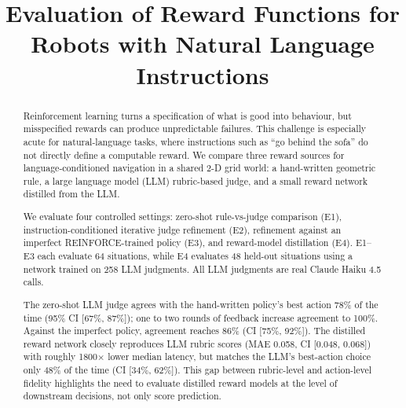 \documentclass[conference]{IEEEtran}
\newcommand\AtPageUpperMyright[1]{\AtPageUpperLeft{%
  \put(\LenToUnit{0.17\paperwidth},\LenToUnit{-2cm}){%
    \parbox{0.9\textwidth}{\raggedleft\fontsize{8}{11}\selectfont #1}}}}
\newcommand{\conf}[1]{\AddToShipoutPictureBG*{\AtPageUpperMyright{#1}}}
\begin{document}
\title{Evaluation of Reward Functions for Robots with Natural Language Instructions}

\author{
\and
{}
}

\maketitle

\begin{abstract}
Reinforcement learning turns a specification of what is good into behaviour, but misspecified rewards can produce unpredictable failures. This challenge is especially acute for natural-language tasks, where instructions such as “go behind the sofa” do not directly define a computable reward. We compare three reward sources for language-conditioned navigation in a shared 2-D grid world: a hand-written geometric rule, a large language model (LLM) rubric-based judge, and a small reward network distilled from the LLM.

We evaluate four controlled settings: zero-shot rule-vs-judge comparison (E1), instruction-conditioned iterative judge refinement (E2), refinement against an imperfect REINFORCE-trained policy (E3), and reward-model distillation (E4). E1–E3 each evaluate 64 situations, while E4 evaluates 48 held-out situations using a network trained on 258 LLM judgments. All LLM judgments are real Claude Haiku 4.5 calls.

The zero-shot LLM judge agrees with the hand-written policy’s best action 78\% of the time (95\% CI [67\%, 87\%]); one to two rounds of feedback increase agreement to 100\%. Against the imperfect policy, agreement reaches 86\% (CI [75\%, 92\%]). The distilled reward network closely reproduces LLM rubric scores (MAE 0.058, CI [0.048, 0.068]) with roughly 1800× lower median latency, but matches the LLM’s best-action choice only 48\% of the time (CI [34\%, 62\%]). This gap between rubric-level and action-level fidelity highlights the need to evaluate distilled reward models at the level of downstream decisions, not only score prediction.


\end{abstract}
\end{document}
